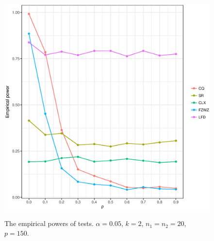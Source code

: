 \documentclass[12pt]{article} %
\theoremstyle{definition}
\begin{document}
\begin{figure}[htbp]
    \centering
    \includegraphics[width=12cm,height=12cm]{figure1}
    \caption{The empirical powers of tests. $\alpha=0.05$, $k=2$, $n_1=n_2=20$, $p=150$.}\label{figure1}
\end{figure}
\end{document}
